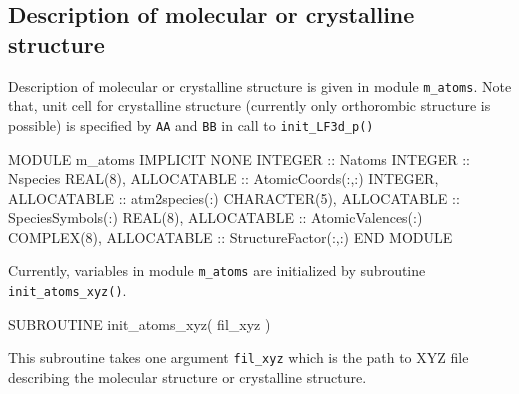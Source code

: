 \subsection{Description of molecular or crystalline structure}

Description of molecular or crystalline structure is given in module {\tt m\_atoms}.
Note that, unit cell for crystalline structure (currently only orthorombic structure is
possible) is specified by {\tt AA} and {\tt BB} in call to {\tt init\_LF3d\_p()}

\begin{fortrancode}
MODULE m_atoms
  IMPLICIT NONE 
  INTEGER :: Natoms
  INTEGER :: Nspecies
  REAL(8), ALLOCATABLE :: AtomicCoords(:,:)
  INTEGER, ALLOCATABLE :: atm2species(:)
  CHARACTER(5), ALLOCATABLE :: SpeciesSymbols(:)
  REAL(8), ALLOCATABLE :: AtomicValences(:)
  COMPLEX(8), ALLOCATABLE :: StructureFactor(:,:)
END MODULE 
\end{fortrancode}

Currently, variables in module {\tt m\_atoms} are initialized by
subroutine {\tt init\_atoms\_xyz()}.
\begin{fortrancode}
SUBROUTINE init_atoms_xyz( fil_xyz )
\end{fortrancode}
This subroutine takes one argument {\tt fil\_xyz} which is the path
to XYZ file describing the molecular structure or crystalline structure.
